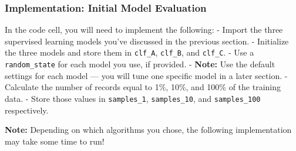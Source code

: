 \documentclass[11pt]{article}
\begin{document}
    \subsubsection{Implementation: Initial Model
Evaluation}\label{implementation-initial-model-evaluation}

In the code cell, you will need to implement the following: - Import the
three supervised learning models you've discussed in the previous
section. - Initialize the three models and store them in
\texttt{\textquotesingle{}clf\_A\textquotesingle{}},
\texttt{\textquotesingle{}clf\_B\textquotesingle{}}, and
\texttt{\textquotesingle{}clf\_C\textquotesingle{}}. - Use a
\texttt{\textquotesingle{}random\_state\textquotesingle{}} for each
model you use, if provided. - \textbf{Note:} Use the default settings
for each model --- you will tune one specific model in a later section.
- Calculate the number of records equal to 1\%, 10\%, and 100\% of the
training data. - Store those values in
\texttt{\textquotesingle{}samples\_1\textquotesingle{}},
\texttt{\textquotesingle{}samples\_10\textquotesingle{}}, and
\texttt{\textquotesingle{}samples\_100\textquotesingle{}} respectively.

\textbf{Note:} Depending on which algorithms you chose, the following
implementation may take some time to run!
\end{document}
